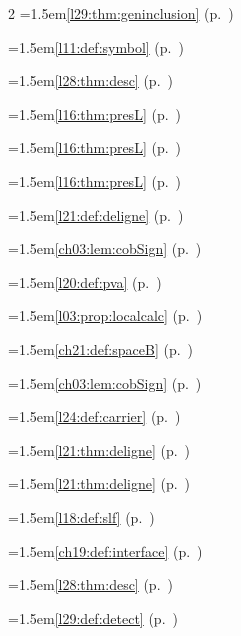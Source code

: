 \begin{multicols}{2}
\hangindent=1.5em\quad \ref{l29:thm:geninclusion} (p.~\pageref{l29:thm:geninclusion})\par
\hangindent=1.5em\quad \ref{l11:def:symbol} (p.~\pageref{l11:def:symbol})\par
\hangindent=1.5em\quad \ref{l28:thm:desc} (p.~\pageref{l28:thm:desc})\par
\hangindent=1.5em\quad \ref{l16:thm:presL} (p.~\pageref{l16:thm:presL})\par
\hangindent=1.5em\quad \ref{l16:thm:presL} (p.~\pageref{l16:thm:presL})\par
\hangindent=1.5em\quad \ref{l16:thm:presL} (p.~\pageref{l16:thm:presL})\par
\hangindent=1.5em\quad \ref{l21:def:deligne} (p.~\pageref{l21:def:deligne})\par
\hangindent=1.5em\quad \ref{ch03:lem:cobSign} (p.~\pageref{ch03:lem:cobSign})\par
\hangindent=1.5em\quad \ref{l20:def:pva} (p.~\pageref{l20:def:pva})\par
\hangindent=1.5em\quad \ref{l03:prop:localcalc} (p.~\pageref{l03:prop:localcalc})\par
\hangindent=1.5em\quad \ref{ch21:def:spaceB} (p.~\pageref{ch21:def:spaceB})\par
\hangindent=1.5em\quad \ref{ch03:lem:cobSign} (p.~\pageref{ch03:lem:cobSign})\par
\hangindent=1.5em\quad \ref{l24:def:carrier} (p.~\pageref{l24:def:carrier})\par
\hangindent=1.5em\quad \ref{l21:thm:deligne} (p.~\pageref{l21:thm:deligne})\par
\hangindent=1.5em\quad \ref{l21:thm:deligne} (p.~\pageref{l21:thm:deligne})\par
\hangindent=1.5em\quad \ref{l18:def:slf} (p.~\pageref{l18:def:slf})\par
\hangindent=1.5em\quad \ref{ch19:def:interface} (p.~\pageref{ch19:def:interface})\par
\hangindent=1.5em\quad \ref{l28:thm:desc} (p.~\pageref{l28:thm:desc})\par
\hangindent=1.5em\quad \ref{l29:def:detect} (p.~\pageref{l29:def:detect})\par

\end{multicols}
